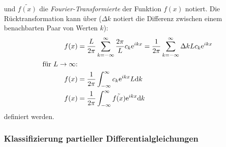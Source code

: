 und $\tilde{f(x)}$ die \emph{Fourier-Transformierte} der Funktion $f(x)$ notiert. Die Rücktransformation kann über ($\Delta k$ notiert die Differenz zwischen einem benachbarten Paar von Werten $k$):
\begin{align*}
    f(x) &= \frac{L}{2\pi}\sum_{k=-\infty}^{\infty}{\frac{2\pi}{L}c_k \text{e}^{ikx}} = \frac{1}{2\pi}\sum_{k=-\infty}^{\infty}{\Delta k Lc_k \text{e}^{ikx}} \\
    \text{für $L\to \infty$:} \\
    f(x) &= \frac{1}{2\pi}\int_{-\infty}^{\infty}{c_k \text{e}^{ikx} L \text{d} k} \\
    f(x) &= \frac{1}{2\pi}\int_{-\infty}^{\infty}{\tilde{f(x)}\text{e}^{ikx}\text{d} k}
\end{align*}
definiert werden.

\subsubsection{Klassifizierung partieller Differentialgleichungen}

